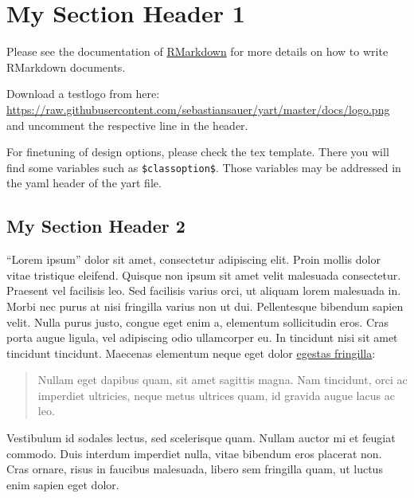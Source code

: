\documentclass[11pt,a4paper,oneside]{article}
\begin{document}
\newpage
{}
\hypertarget{my-section-header-1}{%
\section{My Section Header 1}\label{my-section-header-1}}

Please see the documentation of
\href{http://rmarkdown.rstudio.com/}{RMarkdown} for more details on how
to write RMarkdown documents.

Download a testlogo from here:
\url{https://raw.githubusercontent.com/sebastiansauer/yart/master/docs/logo.png}
and uncomment the respective line in the header.

For finetuning of design options, please check the tex template. There
you will find some variables such as \texttt{\$classoption\$}. Those
variables may be addressed in the yaml header of the yart file.

\hypertarget{my-section-header-2}{%
\subsection{My Section Header 2}\label{my-section-header-2}}

\enquote{Lorem ipsum} dolor sit amet, consectetur adipiscing elit. Proin
mollis dolor vitae tristique eleifend. Quisque non ipsum sit amet velit
malesuada consectetur. Praesent vel facilisis leo. Sed facilisis varius
orci, ut aliquam lorem malesuada in. Morbi nec purus at nisi fringilla
varius non ut dui. Pellentesque bibendum sapien velit. Nulla purus
justo, congue eget enim a, elementum sollicitudin eros. Cras porta augue
ligula, vel adipiscing odio ullamcorper eu. In tincidunt nisi sit amet
tincidunt tincidunt. Maecenas elementum neque eget dolor
\href{http://example.com}{egestas fringilla}:

\begin{quote}
Nullam eget dapibus quam, sit amet sagittis magna. Nam tincidunt, orci
ac imperdiet ultricies, neque metus ultrices quam, id gravida augue
lacus ac leo.
\end{quote}

Vestibulum id sodales lectus, sed scelerisque quam. Nullam auctor mi et
feugiat commodo. Duis interdum imperdiet nulla, vitae bibendum eros
placerat non. Cras ornare, risus in faucibus malesuada, libero sem
fringilla quam, ut luctus enim sapien eget dolor.
\end{document}
